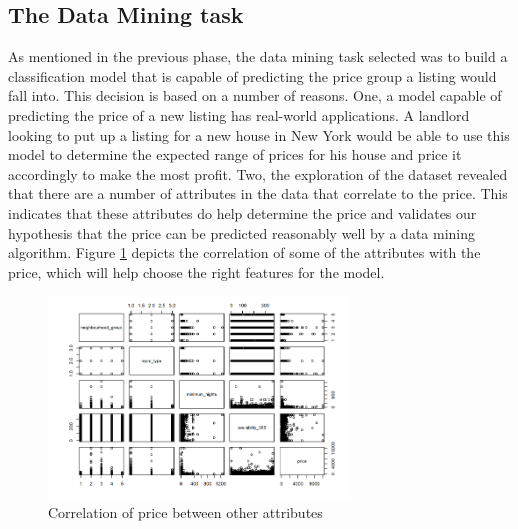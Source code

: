 \documentclass{sig-alternate}
\begin{document}
	\subsection{The Data Mining task}
	As mentioned in the previous phase, the data mining task selected was to build a classification model that is capable of predicting the price group a listing would fall into. This decision is based on a number of reasons. One, a model capable of predicting the price of a new listing has real-world applications. A landlord looking to put up a listing for a new house in New York would be able to use this model to determine the expected range of prices for his house and price it accordingly to make the most profit. Two, the exploration of the dataset revealed that there are a number of attributes in the data that correlate to the price. This indicates that these attributes do help determine the price and validates our hypothesis that the price can be predicted reasonably well by a data mining algorithm. Figure \ref{corr} depicts the correlation of some of the attributes with the price, which will help choose the right features for the model. 
	\begin{figure}[ht]
		\includegraphics[width=8cm]{corr.png}
		\centering
		\caption{Correlation of price between other attributes}
		\label{corr}
	\end{figure}
	
\end{document}

